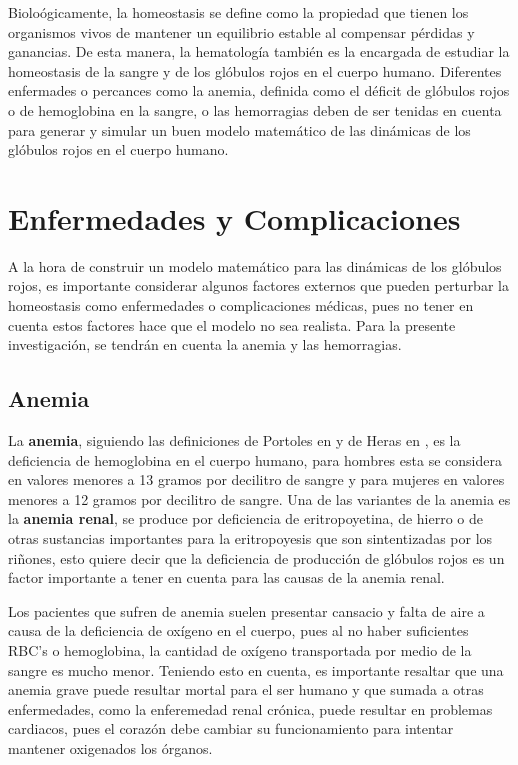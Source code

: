 Bioloógicamente, la homeostasis se define como la propiedad que tienen los organismos vivos de mantener un equilibrio estable al compensar pérdidas y ganancias. De esta manera, la hematología también es la encargada de estudiar la homeostasis de la sangre y de los glóbulos rojos en el cuerpo humano. Diferentes enfermades o percances como la anemia, definida como el déficit de glóbulos rojos o de hemoglobina en la sangre, o las hemorragias deben de ser tenidas en cuenta para generar y simular un buen modelo matemático de las dinámicas de los glóbulos rojos en el cuerpo humano.

\section{Enfermedades y Complicaciones}\label{sec:RBC:enfermedades}

A la hora de construir un modelo matemático para las dinámicas de los glóbulos rojos, es importante considerar algunos factores externos que pueden perturbar la homeostasis como enfermedades o complicaciones médicas, pues no tener en cuenta estos factores hace que el modelo no sea realista. Para la presente investigación, se tendrán en cuenta la anemia y las hemorragias.

\subsection{Anemia}
La \textbf{anemia}, siguiendo las definiciones de Portoles en \cite{portoles2021anemia} y de Heras en \cite{heras2023anemia}, es la deficiencia de hemoglobina en el cuerpo humano, para hombres esta se considera en valores menores a 13 gramos por decilitro de sangre y para mujeres en valores menores a 12 gramos por decilitro de sangre. Una de las variantes de la anemia es la \textbf{anemia renal}, se produce por deficiencia de eritropoyetina, de hierro o de otras sustancias importantes para la eritropoyesis que son sintentizadas por los riñones, esto quiere decir que la deficiencia de producción de glóbulos rojos es un factor importante a tener en cuenta para las causas de la anemia renal.

Los pacientes que sufren de anemia suelen presentar cansacio y falta de aire a causa de la deficiencia de oxígeno en el cuerpo, pues al no haber suficientes RBC's o hemoglobina, la cantidad de oxígeno transportada por medio de la sangre es mucho menor. Teniendo esto en cuenta, es importante resaltar que una anemia grave puede resultar mortal para el ser humano y que sumada a otras enfermedades, como la enferemedad renal crónica, puede resultar en problemas cardiacos, pues el corazón debe cambiar su funcionamiento para intentar mantener oxigenados los órganos.

